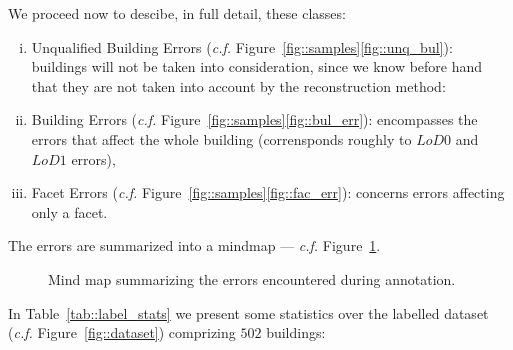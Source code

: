 \documentclass[../main.tex]{subfiles}
\begin{document}
    We proceed now to descibe, in full detail, these classes:

    \begin{enumerate}[(i)]
        \item Unqualified Building Errors (\textit{c.f.} Figure~\ref{fig::samples}\ref{fig::unq_bul}): buildings will not be taken into consideration, since we know before hand that they are not taken into account by the reconstruction method:
        \item Building Errors (\textit{c.f.} Figure~\ref{fig::samples}\ref{fig::bul_err}): encompasses the errors that affect the whole building (corrensponds roughly to $LoD0$ and $LoD1$ errors),
        \item Facet Errors (\textit{c.f.} Figure~\ref{fig::samples}\ref{fig::fac_err}): concerns errors affecting only a facet.
    \end{enumerate}

    The errors are summarized into a mindmap --- \textit{c.f.} Figure~\ref{fig::mindmap_errors}.

    \begin{figure}
        \begin{center}
            
            \caption{\label{fig::mindmap_errors} Mind map summarizing the errors encountered during annotation.}
        \end{center}
    \end{figure}

    In Table~\ref{tab::label_stats} we present some statistics over the labelled dataset (\textit{c.f.} Figure~\ref{fig::dataset}) comprizing $502$ buildings:
\end{document}

